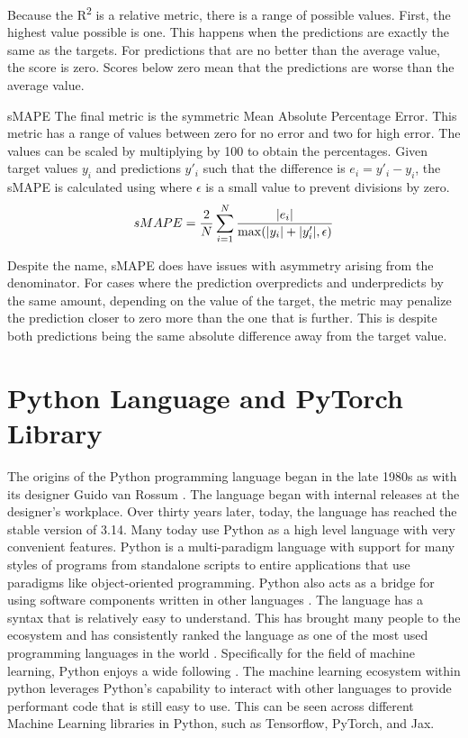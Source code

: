 \begin{numdesc}
  Because the R\textsuperscript{2} is a relative metric, there is a range of possible values. First, the highest value possible is one. This happens when the predictions are exactly the same as the targets. For predictions that are no better than the average value, the score is zero. Scores below zero mean that the predictions are worse than the average value.
  \item[sMAPE]
  The final metric is the symmetric Mean Absolute Percentage Error. This metric has a range of values between zero for no error and two for high error. The values can be scaled by multiplying by 100 to obtain the percentages. Given target values \(y_i\) and predictions \(y'_i\) such that the difference is \(e_{i} = y'_i-y_i\), the sMAPE is calculated using  where \(\epsilon \) is a small value to prevent divisions by zero.
  \begin{equation}
    sMAPE = \frac{2}{N} \sum_{i=1}^{N}\frac{\abs{e_{i}}}{\max(\abs{y_{i}} + \abs{y'_{i}},\epsilon)}\label{eq:smape}
  \end{equation}

  Despite the name, sMAPE does have issues with asymmetry arising from the denominator. For cases where the prediction overpredicts and underpredicts by the same amount, depending on the value of the target, the metric may penalize the prediction closer to zero more than the one that is further. This is despite both predictions being the same absolute difference away from the target value.

\end{numdesc}

\section{Python Language and PyTorch Library}
\noindent The origins of the Python programming language began in the late 1980s as with its designer Guido van Rossum \autocite{rossumHistoryPythonBrief2009}. The language began with internal releases at the designer's workplace. Over thirty years later, today, the language has reached the stable version of \num{3.14}. Many today use Python as a high level language with very convenient features. Python is a multi-paradigm language with support for many styles of programs from standalone scripts to entire applications that use paradigms like object-oriented programming. Python also acts as a bridge for using software components written in other languages \autocite{rossumGlueItAll1998}. The language has a syntax that is relatively easy to understand. This has brought many people to the ecosystem and has consistently ranked the language as one of the most used programming languages in the world \autocite{stackoverflowTechnology2024Stack2024}. Specifically for the field of machine learning, Python enjoys a wide following \autocite{jetbrainsLanguagesStateDeveloper2023}. The machine learning ecosystem within python leverages Python's capability to interact with other languages to provide performant code that is still easy to use. This can be seen across different Machine Learning libraries in Python, such as Tensorflow, PyTorch, and Jax.

